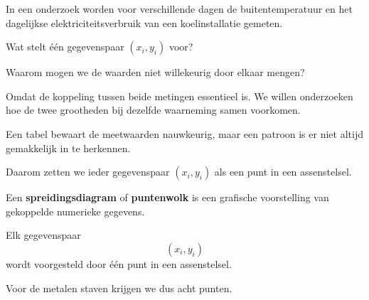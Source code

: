 \documentclass{ximera}
\begin{document}
\begin{oefening}{\oefB \ESS}

In een onderzoek worden voor verschillende dagen de buitentemperatuur
en het dagelijkse elektriciteitsverbruik van een koelinstallatie gemeten.

\begin{question}
Wat stelt één gegevenspaar $(x_i,y_i)$ voor?

\begin{multipleChoice}
\end{multipleChoice}
\end{question}

\begin{question}
Waarom mogen we de waarden niet willekeurig door elkaar mengen?

\begin{oplossing}
Omdat de koppeling tussen beide metingen essentieel is.
We willen onderzoeken hoe de twee grootheden bij dezelfde waarneming
samen voorkomen.
\end{oplossing}
\end{question}
\end{oefening}



Een tabel bewaart de meetwaarden nauwkeurig, maar een patroon is er
niet altijd gemakkelijk in te herkennen.

Daarom zetten we ieder gegevenspaar $(x_i,y_i)$ als een punt in een
assenstelsel.

\begin{definitie}
Een \textbf{spreidingsdiagram} of \textbf{puntenwolk} is een grafische
voorstelling van gekoppelde numerieke gegevens.

Elk gegevenspaar
\[
(x_i,y_i)
\]
wordt voorgesteld door één punt in een assenstelsel.
\end{definitie}

Voor de metalen staven krijgen we dus acht punten.

\begin{center}
\end{center}
\end{document}
